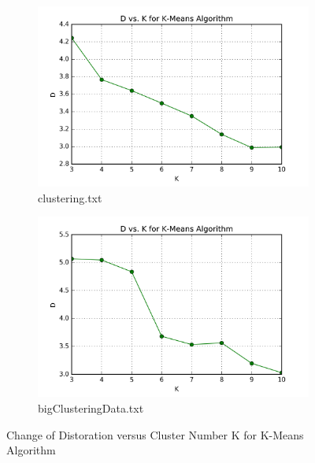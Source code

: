 \begin{description}
\begin{figure}[H]
\centering
\centering
        \begin{subfigure}[b]{0.49\textwidth}
            \centering
            \includegraphics[width=\textwidth]{./figures/loss_clustering_kMeans.png}
            \caption{clustering.txt}\label{fig:3a}
        \end{subfigure}
        \hfill
        \begin{subfigure}[b]{0.49\textwidth}  
            \centering 
            \includegraphics[width=\textwidth]{./figures/loss_bigClustering_kMeans.png}
            \caption{bigClusteringData.txt}\label{fig:3b}
        \end{subfigure}
\caption{Change of Distoration versus Cluster Number K for K-Means Algorithm}
\label{fig:k-means-loss} 
\end{figure}


\end{description}
